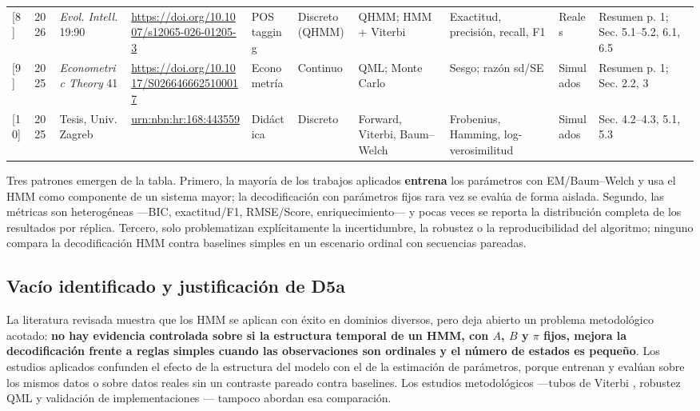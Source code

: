 \documentclass[11pt,a4paper]{article}
\begin{document}
\begin{table}
\begin{tabular}
{}[8] & 2026 & \emph{Evol. Intell.} 19:90 & \url{https://doi.org/10.1007/s12065-026-01205-3} & POS tagging & Discreto (QHMM) & QHMM; HMM + Viterbi & Exactitud, precisión, recall, F1 & Reales & Resumen p. 1; Sec. 5.1--5.2, 6.1, 6.5\\
{}[9] & 2025 & \emph{Econometric Theory} 41 & \url{https://doi.org/10.1017/S0266466625100017} & Econometría & Continuo & QML; Monte Carlo & Sesgo; razón sd/SE & Simulados & Resumen p. 1; Sec. 2.2, 3\\
{}[10] & 2025 & Tesis, Univ. Zagreb & \url{urn:nbn:hr:168:443559} & Didáctica & Discreto & Forward, Viterbi, Baum--Welch & Frobenius, Hamming, log-verosimilitud & Simulados & Sec. 4.2--4.3, 5.1, 5.3\\
\bottomrule
\end{tabular}
\end{table}

Tres patrones emergen de la tabla. Primero, la mayoría de los trabajos aplicados \textbf{entrena} los parámetros con EM/Baum--Welch y usa el HMM como componente de un sistema mayor; la decodificación con parámetros fijos rara vez se evalúa de forma aislada. Segundo, las métricas son heterogéneas ---BIC, exactitud/F1, RMSE/Score, enriquecimiento--- y pocas veces se reporta la distribución completa de los resultados por réplica. Tercero, solo \cite{nicosia2026,pouzo2025,shevtsov2025} problematizan explícitamente la incertidumbre, la robustez o la reproducibilidad del algoritmo; ninguno compara la decodificación HMM contra baselines simples en un escenario ordinal con secuencias pareadas.

\subsection{Vacío identificado y justificación de D5a}

La literatura revisada muestra que los HMM se aplican con éxito en dominios diversos, pero deja abierto un problema metodológico acotado: \textbf{no hay evidencia controlada sobre si la estructura temporal de un HMM, con \(A\), \(B\) y \(\pi\) fijos, mejora la decodificación frente a reglas simples cuando las observaciones son ordinales y el número de estados es pequeño}. Los estudios aplicados confunden el efecto de la estructura del modelo con el de la estimación de parámetros, porque entrenan y evalúan sobre los mismos datos o sobre datos reales sin un contraste pareado contra baselines. Los estudios metodológicos ---tubos de Viterbi \cite{nicosia2026}, robustez QML \cite{pouzo2025} y validación de implementaciones \cite{shevtsov2025}--- tampoco abordan esa comparación.
\end{document}
